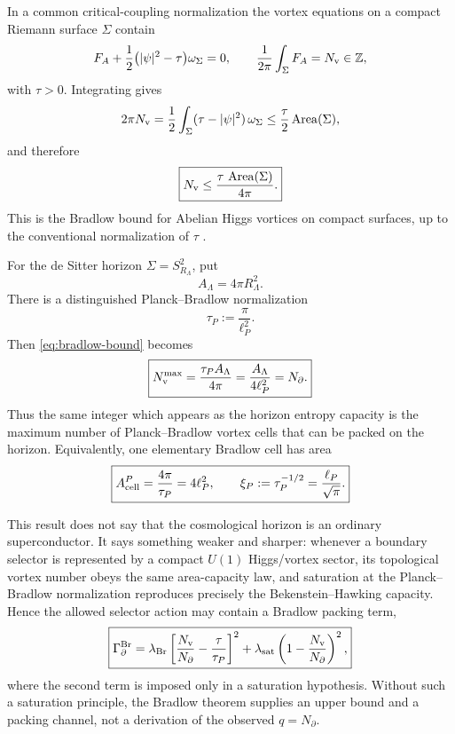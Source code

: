 \documentclass[aps,prd,reprint,nofootinbib,superscriptaddress,floatfix]{revtex4-2}
\numberwithin{equation}{section}
\theoremstyle{definition}
\theoremstyle{plain}
\newcommand{\Ncap}{N_{\partial}}
\begin{document}
In a common critical-coupling normalization the vortex equations on a compact
Riemann surface \(\Sigma\) contain
\begin{equation}
F_A+\frac12\bigl(|\psi|^2-\tau\bigr)\omega_\Sigma=0,
\qquad
\frac{1}{2\pi}\int_\Sigma F_A=N_{\rm v}\in\mathbb Z ,
\end{equation}
with \(\tau>0\).  Integrating gives
\begin{equation}
2\pi N_{\rm v}
=\frac12\int_\Sigma(\tau-|\psi|^2)\,\omega_\Sigma
\le
\frac{\tau}{2}\operatorname{Area}(\Sigma),
\end{equation}
and therefore
\begin{equation}
\boxed{
N_{\rm v}\le
\frac{\tau\,\operatorname{Area}(\Sigma)}{4\pi}.
}
\label{eq:bradlow-bound}
\end{equation}
This is the Bradlow bound for Abelian Higgs vortices on compact surfaces,
up to the conventional normalization of \(\tau\) \cite{Bradlow1990,AdamSpeightWereszczynski2017,ZhangAbrikosov}.

For the de Sitter horizon \(\Sigma=S^2_{R_\Lambda}\), put
\begin{equation}
A_\Lambda=4\pi R_\Lambda^2.
\end{equation}
There is a distinguished Planck--Bradlow normalization
\begin{equation}
\boxed{
\tau_P:=\frac{\pi}{\ell_P^2}.
}
\end{equation}
Then \cref{eq:bradlow-bound} becomes
\begin{equation}
\boxed{
N_{\rm v}^{\max}
=
\frac{\tau_P A_\Lambda}{4\pi}
=
\frac{A_\Lambda}{4\ell_P^2}
=
\Ncap .
}
\end{equation}
Thus the same integer which appears as the horizon entropy capacity is the
maximum number of Planck--Bradlow vortex cells that can be packed on the
horizon.  Equivalently, one elementary Bradlow cell has area
\begin{equation}
\boxed{
A_{\rm cell}^{P}=\frac{4\pi}{\tau_P}=4\ell_P^2,
\qquad
\xi_P:=\tau_P^{-1/2}=\frac{\ell_P}{\sqrt{\pi}}.
}
\end{equation}

This result does not say that the cosmological horizon is an ordinary
superconductor.  It says something weaker and sharper: whenever a boundary
selector is represented by a compact \(U(1)\) Higgs/vortex sector, its
topological vortex number obeys the same area-capacity law, and saturation at
the Planck--Bradlow normalization reproduces precisely the Bekenstein--Hawking
capacity.  Hence the allowed selector action may contain a Bradlow packing
term,
\begin{equation}
\boxed{
\Gamma_{\partial}^{\rm Br}
=
\lambda_{\rm Br}
\left[
\frac{N_{\rm v}}{\Ncap}
-
\frac{\tau}{\tau_P}
\right]^2
+
\lambda_{\rm sat}
\left(1-\frac{N_{\rm v}}{\Ncap}\right)^2 ,
}
\end{equation}
where the second term is imposed only in a saturation hypothesis.  Without
such a saturation principle, the Bradlow theorem supplies an upper bound and a
packing channel, not a derivation of the observed \(q=\Ncap\).
\end{document}
